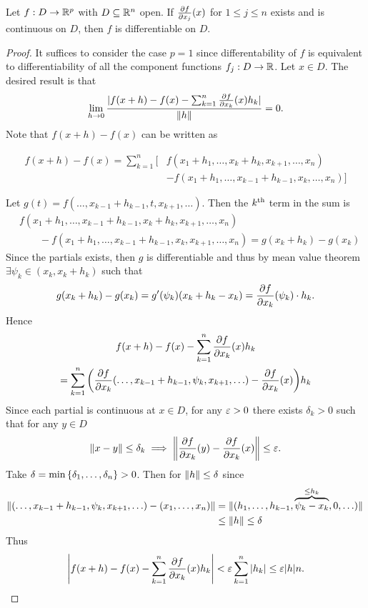 \documentclass[../main.tex]{subfiles}
\begin{document}
\begin{theorem}
    Let $f : D \to \mathbb{R}^p$ with $D \subseteq \mathbb{R}^n$ open. If $\pdv{f}{x_j}\relax (x)$ for $1 \leq j \leq n$ exists and is continuous on $D$, then $f$ is differentiable on $D$.
\end{theorem}

\begin{proof}
    It suffices to consider the case $p = 1$ since differentability of $f$ is equivalent to differentiability of all the component functions $f_j : D \to \mathbb{R}$. Let $x \in D$. The desired result is that
    \[
        \lim_{h \to 0} \frac{|f(x+h) - f(x) - \sum_{k=1}^n \pdv{f}{x_k}\relax(x) h_k|}{\norm{h}} = 0
    .\]
    Note that $f(x+h) - f(x)$ can be written as

    \begin{align*}
        f(x+h) - f(x) = \sum_{k=1}^n \bigl[&f(x_1 + h_1, \ldots, x_k + h_k, x_{k+1}, \ldots, x_n) \\
                      &- f(x_1 + h_1, \ldots, x_{k-1} + h_{k-1}, x_k, \ldots, x_n)\bigr]
    \end{align*}

    Let $g(t) = f(\ldots, x_{k-1} + h_{k-1}, t, x_{k+1}, \ldots)$. Then the $k^{\text{th}}$ term in the sum is
    \begin{align*}
        &f(x_1 + h_1, \ldots, x_{k-1} + h_{k-1}, x_{k} + h_k, x_{k+1}, \ldots, x_n) \\
        &\quad\quad - f(x_1 + h_1, \ldots, x_{k-1} + h_{k-1}, x_{k}, x_{k+1}, \ldots, x_n) = g(x_k + h_k) - g(x_k)
    \end{align*}
    Since the partials exists, then $g$ is differentiable and thus by mean value theorem $\exists \psi_k \in (x_k, x_{k} + h_k)$ such that
    \[
        g(x_k + h_k) - g(x_k) = g'(\psi_k) (x_k + h_k - x_k) = \pdv{f}{x_k}\relax(\psi_k) \cdot h_k
    .\]
    Hence
    \begin{multline}
        f(x+h) - f(x) - \sum_{k=1}^n \pdv{f}{x_k}\relax(x) h_k  \\
        = \sum_{k=1}^n \qty(\pdv{f}{x_k}\relax(\ldots, x_{k-1} + h_{k-1}, \psi_k, x_{k+1}, \ldots) - \pdv{f}{x_k}\relax(x)) h_k
    \end{multline}
    Since each partial is continuous at $x \in D$, for any $\varepsilon > 0$ there exists $\delta_k > 0$ such that for any $y \in D$
    \[
        \norm{x - y} \leq \delta_k \implies \norm{\pdv{f}{x_k}\relax(y) - \pdv{f}{x_k}\relax(x)} \leq \varepsilon
    .\]
    Take $\delta = \min\qty{\delta_1, \ldots, \delta_n} > 0$. Then for $\norm{h} \leq \delta$ since
    \begin{align*}
        \norm{(\ldots, x_{k-1} + h_{k-1}, \psi_k, x_{k+1}, \ldots) - (x_1, \ldots, x_n)} &= \norm*{(h_1, \ldots, h_{k-1}, \overbrace{\psi_k - x_k}^{\leq h_k}, 0, \ldots)} \\
        &\leq \norm{h} \leq \delta
    \end{align*}
    Thus
    \[
        \qty|f(x+h) - f(x) - \sum_{k=1}^n \pdv{f}{x_k}\relax(x) h_k| < \varepsilon \sum_{k=1}^n |h_k| \leq \varepsilon |h| n
    .\]
\end{proof}
\end{document}
